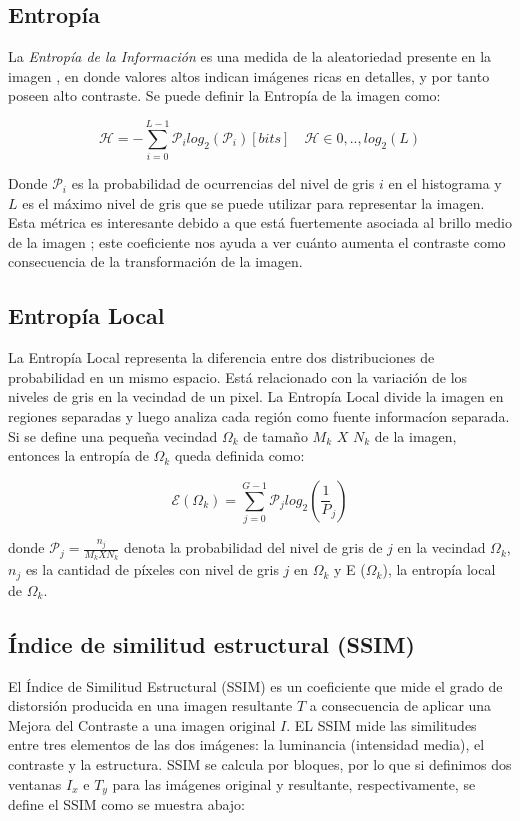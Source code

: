 \documentclass[spanish,twocolumn]{article}
\begin{document}
\subsection{Entropía}
\label{ssec:entropia}

La {\it Entropía de la Información} es una medida de la aleatoriedad presente en la imagen \cite{tsai2008information}, en donde valores altos indican imágenes ricas en detalles, y por tanto poseen alto contraste. Se puede definir la Entropía de la imagen como: 

\begin{equation}\label{eq:entropia}
\mathscr{H}=-\sum_{i=0}^{L-1}\mathcal{P}_i log_2(\mathcal{P}_i) [bits] \quad \mathscr{H} \in {0,..,log_2(L)} 
\end{equation}

Donde $\mathcal{P}_i$ es la probabilidad de ocurrencias del nivel de gris $i$ en el histograma y $L$ es el máximo nivel de gris que se puede utilizar para representar la imagen. Esta métrica es interesante debido a que está fuertemente asociada al brillo medio de la imagen \cite{108593}; este coeficiente nos ayuda a ver cuánto aumenta el contraste como consecuencia de la transformación de la imagen.


\subsection{Entropía Local}
\label{ssec:entropialocal}
La Entropía Local representa la diferencia entre dos distribuciones de probabilidad en un mismo espacio. Está relacionado con la variación de los niveles de gris en la vecindad de un pixel. La Entropía Local divide la imagen en regiones separadas y luego analiza cada región como fuente informacíon separada.
Si se define una pequeña vecindad $\Omega_k$ de tamaño $M_k$ $X$ $N_k$ de la imagen, entonces la entropía de $\Omega_k$ queda definida como:

\begin{equation}\label{eq:entropialocal}
 \mathscr E{(\Omega_k)}=\sum_{j=0}^{G-1}\mathcal P_j log_2(\frac{1}{P}_j)
\end{equation}

donde $\mathcal P_j=\frac{n_j}{M_k X N_k}$ denota la probabilidad del nivel de gris de $j$ en la vecindad  $\Omega_k$, $n_j$ es la cantidad de píxeles con nivel de gris $j$ en  $\Omega_k$ y E ($\Omega_k$), la entropía local de  $\Omega_k$.

\subsection{Índice de similitud estructural (SSIM)}
\label{ssec:ssim}
El {Índice de Similitud Estructural (SSIM)} \cite{wang2004image} es un coeficiente que mide el grado de distorsión producida en una imagen resultante $T$ a consecuencia de aplicar una Mejora del Contraste a una imagen original $I$. 
EL SSIM mide las similitudes entre tres elementos de las dos imágenes: la luminancia (intensidad media), el contraste y la estructura. SSIM se calcula por bloques, por lo que si definimos dos ventanas $I_x$ e $T_y$ para las imágenes original y resultante, respectivamente, se define el SSIM como se muestra abajo:
\end{document}
